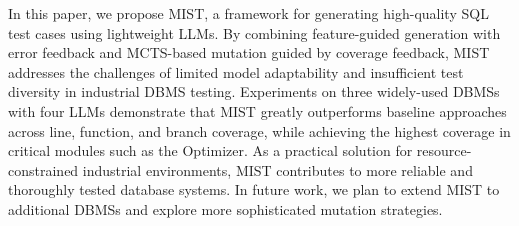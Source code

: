 \label{sec:conclusions}
In this paper, we propose MIST, a framework for generating high-quality SQL test cases using lightweight LLMs. By combining feature-guided generation with error feedback and MCTS-based mutation guided by coverage feedback, MIST addresses the challenges of limited model adaptability and insufficient test diversity in industrial DBMS testing. Experiments on three widely-used DBMSs with four LLMs demonstrate that MIST greatly outperforms baseline approaches across line, function, and branch coverage, while achieving the highest coverage in critical modules such as the Optimizer. As a practical solution for resource-constrained industrial environments, MIST contributes to more reliable and thoroughly tested database systems. In future work, we plan to extend MIST to additional DBMSs and explore more sophisticated mutation strategies.